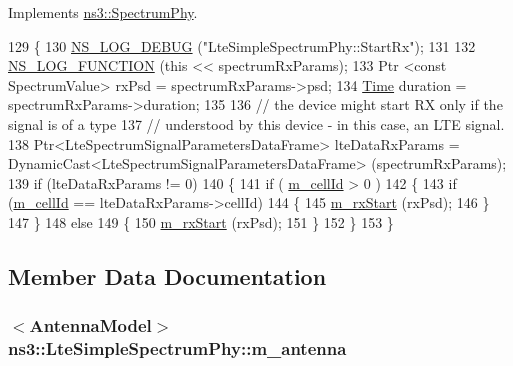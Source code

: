 Implements \hyperlink{classns3_1_1SpectrumPhy_a2442b53be3ce1abf40b05780548a6e66}{ns3\+::\+Spectrum\+Phy}.


\begin{DoxyCode}
129 \{
130   \hyperlink{group__logging_ga413f1886406d49f59a6a0a89b77b4d0a}{NS\_LOG\_DEBUG} (\textcolor{stringliteral}{"LteSimpleSpectrumPhy::StartRx"});
131 
132   \hyperlink{log-macros-disabled_8h_a90b90d5bad1f39cb1b64923ea94c0761}{NS\_LOG\_FUNCTION} (\textcolor{keyword}{this} << spectrumRxParams);
133   Ptr <const SpectrumValue> rxPsd = spectrumRxParams->psd;
134   \hyperlink{namespacens3_1_1TracedValueCallback_a7ffd3e7c142ffe7c8a1d2db9b8de38ec}{Time} duration = spectrumRxParams->duration;
135 
136   \textcolor{comment}{// the device might start RX only if the signal is of a type}
137   \textcolor{comment}{// understood by this device - in this case, an LTE signal.}
138   Ptr<LteSpectrumSignalParametersDataFrame> lteDataRxParams = 
      DynamicCast<LteSpectrumSignalParametersDataFrame> (spectrumRxParams);
139   \textcolor{keywordflow}{if} (lteDataRxParams != 0)
140     \{
141       \textcolor{keywordflow}{if} ( \hyperlink{classns3_1_1LteSimpleSpectrumPhy_af6e426d2c0597d44141e642c8b61b924}{m\_cellId} > 0 )
142         \{
143           \textcolor{keywordflow}{if} (\hyperlink{classns3_1_1LteSimpleSpectrumPhy_af6e426d2c0597d44141e642c8b61b924}{m\_cellId} == lteDataRxParams->cellId)
144             \{
145               \hyperlink{classns3_1_1LteSimpleSpectrumPhy_a62dd25ce9f68081bdf7f5d8f20c834a3}{m\_rxStart} (rxPsd);
146             \}
147         \}
148       \textcolor{keywordflow}{else}
149         \{
150           \hyperlink{classns3_1_1LteSimpleSpectrumPhy_a62dd25ce9f68081bdf7f5d8f20c834a3}{m\_rxStart} (rxPsd);
151         \}
152     \}
153 \}
\end{DoxyCode}


\subsection{Member Data Documentation}
\subsubsection[{\texorpdfstring{m\+\_\+antenna}{m_antenna}}]{$<${\bf Antenna\+Model}$>$ ns3\+::\+Lte\+Simple\+Spectrum\+Phy\+::m\+\_\+antenna\hspace{0.3cm}{\ttfamily [private]}}\hypertarget{classns3_1_1LteSimpleSpectrumPhy_a5dbaa23683c0efcf68397fc7e757e949}{}\label{classns3_1_1LteSimpleSpectrumPhy_a5dbaa23683c0efcf68397fc7e757e949}
